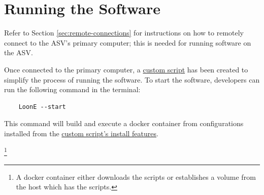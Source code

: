 %
%
%
%

\section{Running the Software}

Refer to Section \ref{sec:remote-connections} for instructions on how to remotely connect to the ASV's primary computer; this is needed for running software on the ASV.

Once connected to the primary computer, a \href{https://github.com/HumberASV/Loon-Env}{custom script} has been created to simplify the process of running the software.
To start the software, developers can run the following command in the terminal:

\begin{verbatim}
    LoonE --start
\end{verbatim}
This command will build and execute a docker container from configurations installed from the \href{https://github.com/HumberASV/Loon-Env}{custom script's install features}.

\footnote{A docker container either downloads the scripts or establishes a volume from the host which has the scripts.}

